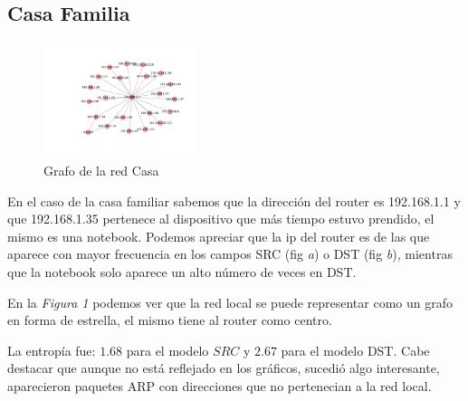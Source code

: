 \subsection{Casa Familia}

\begin{figure}
\vspace{-35pt}
\hspace{-35pt}
\centering
   \includegraphics[width=0.4\textwidth]{resultados/casa/conectividadNX.pdf}
\vspace{-30pt}
   \caption{Grafo de la red Casa}
\end{figure}


En el caso de la casa familiar sabemos que la direcci\'on del router
es 192.168.1.1 y que 192.168.1.35 pertenece al dispositivo que m\'as tiempo estuvo
prendido, el mismo es una notebook. Podemos apreciar que la ip del
router es de las que aparece con mayor frecuencia en los campos SRC (fig \emph{a}) 
o DST (fig \emph{b}), mientras que la notebook solo aparece un alto n\'umero de 
veces en DST. 

En la \emph{Figura 1} podemos ver que la red local se puede representar como 
un grafo en forma de estrella, el mismo tiene al router como centro. 

La entrop\'ia fue: $1.68$ para el modelo $SRC$ y $2.67$ para el modelo DST.
Cabe destacar que aunque no est\'a reflejado en los gr\'aficos, sucedi\'o algo interesante, 
aparecieron paquetes ARP con direcciones que no pertenecian a la red local.

~

~

~

